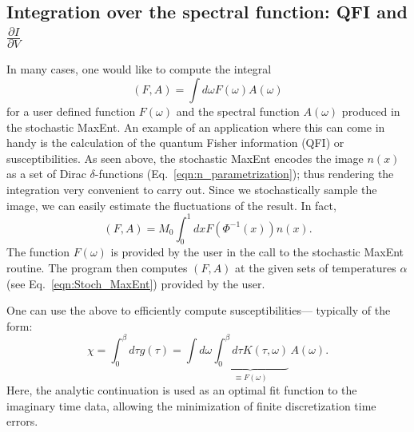 \subsection{ Integration  over  the  spectral  function: QFI and  $\frac{\partial I}{\partial V}$ } 

In many cases,  one  would like  to  compute  the   integral
\begin{equation}
(F,A) = \int d \omega F(\omega) A(\omega)
\end{equation} 
for  a  user  defined  function $F(\omega) $   and  the  spectral  function $A(\omega)$ produced  in the   stochastic  MaxEnt.  An example of an application
where  this  can  come in handy  is  the  calculation of  the    quantum  Fisher  information (QFI) \cite{Hauke16}  or susceptibilities. 
As   seen   above,  the   stochastic MaxEnt   encodes  the  image $n(x)$ as  a  set  of   Dirac $\delta$-functions  (Eq.~\eqref{eqn:n_parametrization}); thus  
rendering the  integration   very  convenient to  carry  out.  Since we  stochastically  sample  the image, we  can easily estimate  
the  fluctuations of  the result.    In fact,  
\begin{equation}
  (F,A)     =  M_0 \int_{0}^{1}d x  F(\Phi^{-1}(x)) n(x) . 
\end{equation}
The  function  $ F(\omega) $  is  provided  by  the  user  in the  call to  the stochastic  MaxEnt  routine.  The  program  then 
computes $(F,A) $ at  the  given  sets  of   temperatures  $\alpha$ (see Eq.~\ref{eqn:Stoch_MaxEnt})   provided  by  the user.    

One  can use  the above  to   efficiently  compute susceptibilities---   typically  of the form: 
\begin{equation}
   \chi  =   \int_{0}^{\beta } d \tau   g(\tau)      =   \int d  \omega \underbrace{ \int_{0}^{\beta}  d  \tau  K(\tau, \omega)  }_{\equiv F(\omega)}   \, A (\omega). 
\end{equation}
Here,  the   analytic  continuation is  used  as   an  optimal fit  function  to  the  imaginary time  data,  allowing the  minimization of   finite  
discretization  time  errors. 

